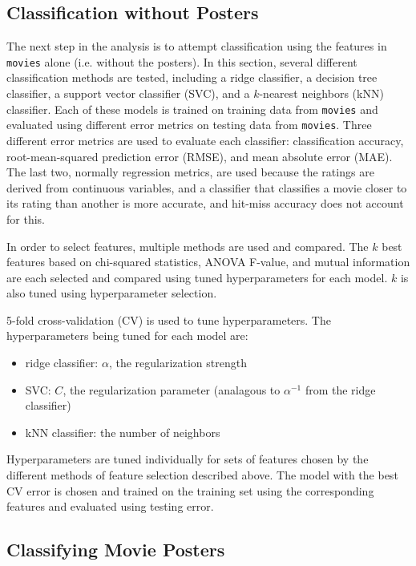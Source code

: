 \documentclass[12pt, oneside]{article}   	%
\begin{document}
\subsection{Classification without Posters}
\label{section:class_no_posters}

The next step in the analysis is to attempt classification using the features in \texttt{movies} alone (i.e. without the posters). In this section, several different classification methods are tested, including a ridge classifier, a decision tree classifier, a support vector classifier (SVC), and a $k$-nearest neighbors (kNN) classifier. Each of these models is trained on training data from \texttt{movies} and evaluated using different error metrics on testing data from \texttt{movies}. Three different error metrics are used to evaluate each classifier: classification accuracy, root-mean-squared prediction error (RMSE), and mean absolute error (MAE). The last two, normally regression metrics, are used because the ratings are derived from continuous variables, and a classifier that classifies a movie closer to its rating than another is more accurate, and hit-miss accuracy does not account for this.

In order to select features, multiple methods are used and compared. The $k$ best features based on chi-squared statistics, ANOVA F-value, and mutual information are each selected and compared using tuned hyperparameters for each model. $k$ is also tuned using hyperparameter selection.

5-fold cross-validation (CV) is used to tune hyperparameters. The hyperparameters being tuned for each model are:
\begin{itemize}
\item ridge classifier: $\alpha$, the regularization strength
\item SVC: $C$, the regularization parameter (analagous to $\alpha^{-1}$ from the ridge classifier)
\item kNN classifier: the number of neighbors
\end{itemize}
Hyperparameters are tuned individually for sets of features chosen by the different methods of feature selection described above. The model with the best CV error is chosen and trained on the training set using the corresponding features and evaluated using testing error.

\subsection{Classifying Movie Posters}
\label{section:class_posters}
\end{document}
